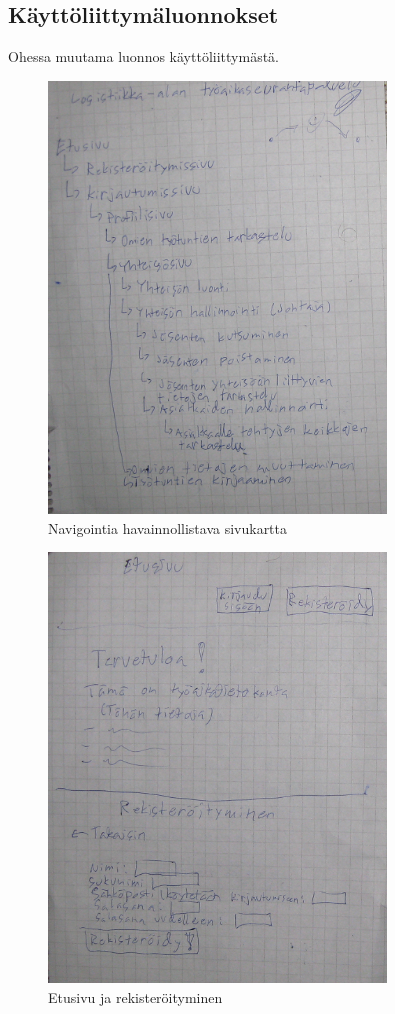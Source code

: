 \documentclass[a4paper, 12pt finnish]{article}
\begin{document}
\subsection{Käyttöliittymäluonnokset}
Ohessa muutama luonnos käyttöliittymästä.
\begin{figure}[h]
    \centering
    \includegraphics[width=0.8\textwidth]{sivukartta.png}
    \caption{\small Navigointia havainnollistava sivukartta}
\end{figure}
\begin{figure}[h]
    \centering
    \includegraphics[width=0.8\textwidth]{etusivu.png}
    \caption{\small Etusivu ja rekisteröityminen}
\end{figure}
\end{document}
